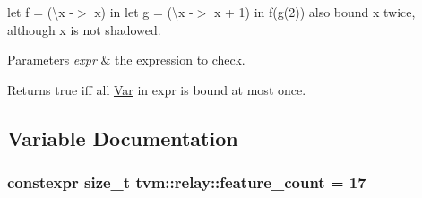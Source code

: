 {\ttfamily let f = (\textbackslash{}x -\/$>$ x) in let g = (\textbackslash{}x -\/$>$ x + 1) in f(g(2))} also bound x twice, although x is not shadowed.


\begin{DoxyParams}{Parameters}
{\em expr} & the expression to check.\\
\hline
\end{DoxyParams}
\begin{DoxyReturn}{Returns}
true iff all \hyperlink{classtvm_1_1relay_1_1Var}{Var} in expr is bound at most once. 
\end{DoxyReturn}


\subsection{Variable Documentation}
\subsubsection[{\texorpdfstring{feature\+\_\+count}{feature_count}}]{\setlength{\rightskip}{0pt plus 5cm}constexpr size\+\_\+t tvm\+::relay\+::feature\+\_\+count = 17}\hypertarget{namespacetvm_1_1relay_ac3a576d7d192ce78bafb169c9aa882d1}{}\label{namespacetvm_1_1relay_ac3a576d7d192ce78bafb169c9aa882d1}
